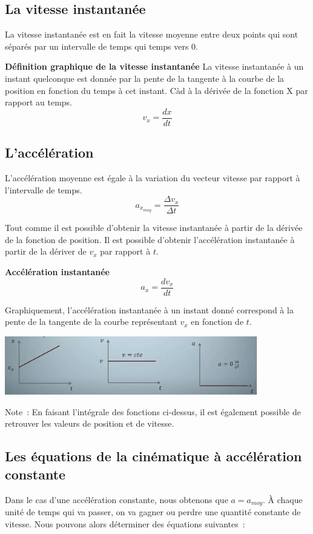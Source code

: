 \documentclass{article}
\begin{document}
\subsection{La vitesse instantanée}
La vitesse instantanée est en fait la vitesse moyenne entre deux points qui sont séparés par un intervalle de temps qui temps vers 0.
\newline

\noindent
\textbf{Définition graphique de la vitesse instantanée}
\newline
La vitesse instantanée à un instant quelconque est donnée par la pente de la tangente à la courbe de la position en fonction du temps à cet instant. Càd à la dérivée de la fonction X par rapport au temps.
\[v_x = \frac{dx}{dt}\]

\subsection{L'accélération}
L'accélération moyenne est égale à la variation du vecteur vitesse par rapport à l'intervalle de temps.
\[a_{x_{moy}} = \frac{\Delta v_x}{\Delta t}\]

Tout comme il est possible d'obtenir la vitesse instantanée à partir de la dérivée de la fonction de position. Il est possible d'obtenir l'accélération instantanée à partir de la dériver de $v_x$ par rapport à $t$.
\newline

\noindent
\textbf{Accélération instantanée}
\[a_x = \frac{dv_x}{dt}\]

Graphiquement, l'accélération instantanée à un instant donné correspond à la pente de la tangente de la courbe représentant $v_x$ en fonction de $t$.

\begin{center}
    \includegraphics[width=11cm]{Image/vitesseCst.png}
\end{center}

\newline

Note : En faisant l'intégrale des fonctions ci-dessus, il est également possible de retrouver les valeurs de position et de vitesse.

\subsection{Les équations de la cinématique à accélération constante}
Dans le cas d'une accélération constante, nous obtenons que $a = a_{moy}$. À chaque unité de temps qui va passer, on va gagner ou perdre une quantité constante de vitesse. Nous pouvons alors déterminer des équations suivantes :
\newline
\end{document}
